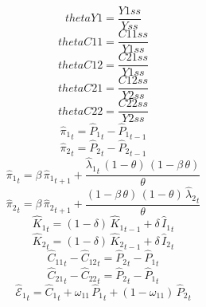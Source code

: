 \begin{dmath*}
thetaY1 = \frac{{Y1ss}}{{Yss}}
\end{dmath*}
\begin{dmath*}
thetaC11 = \frac{{C11ss}}{{Y1ss}}
\end{dmath*}
\begin{dmath*}
thetaC12 = \frac{{C21ss}}{{Y1ss}}
\end{dmath*}
\begin{dmath*}
thetaC21 = \frac{{C12ss}}{{Y2ss}}
\end{dmath*}
\begin{dmath*}
thetaC22 = \frac{{C22ss}}{{Y2ss}}
\end{dmath*}
\begin{dmath}
{{\hat{\pi}_{1}}}_{t}={{\hat{P}_{1}}}_{t}-{{\hat{P}_{1}}}_{t-1}
\end{dmath}
\begin{dmath}
{{\hat{\pi}_{2}}}_{t}={{\hat{P}_{2}}}_{t}-{{\hat{P}_{2}}}_{t-1}
\end{dmath}
\begin{dmath}
{{\hat{\pi}_{1}}}_{t}={{\beta}}\, {{\hat{\pi}_{1}}}_{t+1}+\frac{{{\hat{\lambda}_{1}}}_{t}\, \left(1-{{\theta}}\right)\, \left(1-{{\beta}}\, {{\theta}}\right)}{{{\theta}}}
\end{dmath}
\begin{dmath}
{{\hat{\pi}_{2}}}_{t}={{\beta}}\, {{\hat{\pi}_{2}}}_{t+1}+\frac{\left(1-{{\beta}}\, {{\theta}}\right)\, \left(1-{{\theta}}\right)\, {{\hat{\lambda}_{2}}}_{t}}{{{\theta}}}
\end{dmath}
\begin{dmath}
{{\hat{K}_{1}}}_{t}=\left(1-{{\delta}}\right)\, {{\hat{K}_{1}}}_{t-1}+{{\delta}}\, {{\hat{I}_{1}}}_{t}
\end{dmath}
\begin{dmath}
{{\hat{K}_{2}}}_{t}=\left(1-{{\delta}}\right)\, {{\hat{K}_{2}}}_{t-1}+{{\delta}}\, {{\hat{I}_{2}}}_{t}
\end{dmath}
\begin{dmath}
{{\hat{C}_{1 1}}}_{t}-{{\hat{C}_{1 2}}}_{t}={{\hat{P}_{2}}}_{t}-{{\hat{P}_{1}}}_{t}
\end{dmath}
\begin{dmath}
{{\hat{C}_{2 1}}}_{t}-{{\hat{C}_{2 2}}}_{t}={{\hat{P}_{2}}}_{t}-{{\hat{P}_{1}}}_{t}
\end{dmath}
\begin{dmath}
{{\hat{\mathscr{E}}_{1}}}_{t}={{\hat{C}_{1}}}_{t}+{{\omega_{11}}}\, {{\hat{P}_{1}}}_{t}+\left(1-{{\omega_{11}}}\right)\, {{\hat{P}_{2}}}_{t}
\end{dmath}
